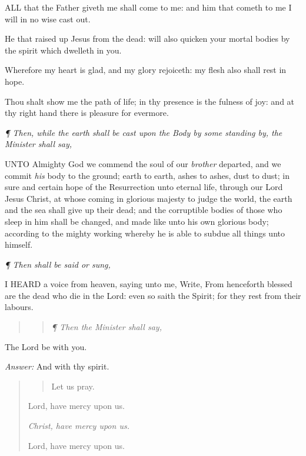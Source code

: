 ALL
that the Father giveth me shall come to me: and him that cometh to me
I will in no wise cast out.

He that raised up Jesus from the dead: will also quicken
your mortal bodies by the spirit which dwelleth in you.

Wherefore my heart is glad, and my glory rejoiceth:
my flesh also shall rest in hope.

Thou shalt show me the path of life; in thy presence
is the fulness of joy: and at thy right hand there is pleasure for evermore.

\emph{¶
Then, while the earth shall be cast upon the Body by some standing by,
the Minister shall say,}

UNTO
Almighty God we commend the soul of our \emph{brother} departed, and
we commit \emph{his} body to the ground; earth to earth, ashes to ashes,
dust to dust; in sure and certain hope of the Resurrection unto eternal
life, through our Lord Jesus Christ, at whose coming in glorious majesty
to judge the world, the earth and the sea shall give up their dead; and
the corruptible bodies of those who sleep in him shall be changed, and
made like unto his own glorious body; according to the mighty working
whereby he is able to subdue all things unto himself.

\emph{¶
Then shall be said or sung,}

I
HEARD a voice from heaven, saying unto me, Write, From henceforth blessed
are the dead who die in the Lord: even so saith the Spirit; for they rest
from their labours.

\begin{quote}

\begin{quote}

\emph{¶
Then the Minister shall say,}

\end{quote}

\end{quote}

The
Lord be with you.

\emph{Answer:} And with
thy spirit.

\begin{quote}

\begin{quote}

Let
us pray.

\end{quote}

Lord,
have mercy upon us.

\emph{Christ, have mercy upon us.}

Lord, have mercy upon us.

\end{quote}


